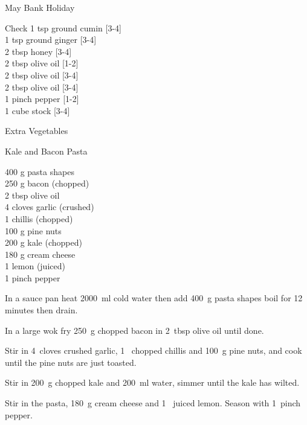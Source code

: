 \begin{menu}{May Bank Holiday}
\begin{shoppinglist}{Check}
      1 tsp ground cumin 
        {\scriptsize[3-4]}\\
      1 tsp ground ginger 
        {\scriptsize[3-4]}\\
      2 tbsp honey 
        {\scriptsize[3-4]}\\
      2 tbsp olive oil 
        {\scriptsize[1-2]}\\
      2 tbsp olive oil 
        {\scriptsize[3-4]}\\
      2 tbsp olive oil 
        {\scriptsize[3-4]}\\
      1 pinch pepper 
        {\scriptsize[1-2]}\\
      1 cube stock 
        {\scriptsize[3-4]}\\
      \end{shoppinglist}%
      \begin{shoppinglist}{Extra Vegetables}
      \end{shoppinglist}%
      \par\vfil %
    \vfil\clearpage
  
    \begin{recipe}{2}{Kale and Bacon Pasta}%
    
		\begin{ingredients}
		400 g pasta shapes  \\
	250 g bacon (chopped) \\
	2 tbsp olive oil  \\
	4 cloves garlic (crushed) \\
	1  chillis (chopped) \\
	100 g pine nuts  \\
	200 g kale (chopped) \\
	180 g cream cheese  \\
	1  lemon (juiced) \\
	1 pinch pepper  \\
	
		\end{ingredients}
	
    \begin{instructions}
    \item 
      In a sauce pan heat
      2000~ml  cold water then add
      400~g  pasta shapes
      boil for 12
      minutes then drain.
    \item 
        In a large wok fry
        250~g chopped bacon
        in
        2~tbsp  olive oil
        until done.
      \item 
        Stir in 
        4~cloves crushed garlic,
        1~ chopped chillis
        and
        100~g  pine nuts,
        and cook until the pine nuts are just toasted.
      \item 
        Stir in
        200~g chopped kale
        and
        200~ml  water,
        simmer until the kale has wilted.
      \item 
        Stir in the pasta,
        180~g  cream cheese
        and
        1~ juiced lemon.
        Season with 
        1~pinch  pepper.
      

\end{instructions}
\end{recipe}
\end{menu}
